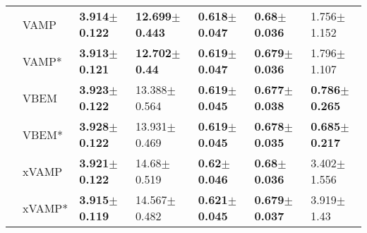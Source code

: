 \begin{tabular}{lllllll}
             & VAMP &  \textbf{3.914$\pm$0.122} &  \textbf{12.699$\pm$0.443} &  \textbf{0.618$\pm$0.047} &   \textbf{0.68$\pm$0.036} &           1.756$\pm$1.152 \\
             & VAMP* &  \textbf{3.913$\pm$0.121} &   \textbf{12.702$\pm$0.44} &  \textbf{0.619$\pm$0.047} &  \textbf{0.679$\pm$0.036} &           1.796$\pm$1.107 \\
             & VBEM &  \textbf{3.923$\pm$0.122} &           13.388$\pm$0.564 &  \textbf{0.619$\pm$0.045} &  \textbf{0.677$\pm$0.038} &  \textbf{0.786$\pm$0.265} \\
             & VBEM* &  \textbf{3.928$\pm$0.122} &           13.931$\pm$0.469 &  \textbf{0.619$\pm$0.045} &  \textbf{0.678$\pm$0.035} &  \textbf{0.685$\pm$0.217} \\
             & xVAMP &  \textbf{3.921$\pm$0.122} &            14.68$\pm$0.519 &   \textbf{0.62$\pm$0.046} &   \textbf{0.68$\pm$0.036} &           3.402$\pm$1.556 \\
             & xVAMP* &  \textbf{3.915$\pm$0.119} &           14.567$\pm$0.482 &  \textbf{0.621$\pm$0.045} &  \textbf{0.679$\pm$0.037} &            3.919$\pm$1.43 \\
\bottomrule
\end{tabular}

